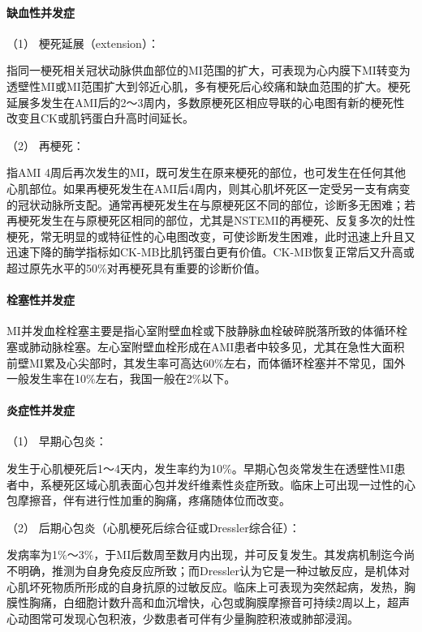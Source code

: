 \paragraph{缺血性并发症}

\hypertarget{text00312.htmlux5cux23CHP10-8-2-2-1-6-2-1}{}
（1） 梗死延展（extension）：

指同一梗死相关冠状动脉供血部位的MI范围的扩大，可表现为心内膜下MI转变为透壁性MI或MI范围扩大到邻近心肌，多有梗死后心绞痛和缺血范围的扩大。梗死延展多发生在AMI后的2～3周内，多数原梗死区相应导联的心电图有新的梗死性改变且CK或肌钙蛋白升高时间延长。

\hypertarget{text00312.htmlux5cux23CHP10-8-2-2-1-6-2-2}{}
（2） 再梗死：

指AMI
4周后再次发生的MI，既可发生在原来梗死的部位，也可发生在任何其他心肌部位。如果再梗死发生在AMI后4周内，则其心肌坏死区一定受另一支有病变的冠状动脉所支配。通常再梗死发生在与原梗死区不同的部位，诊断多无困难；若再梗死发生在与原梗死区相同的部位，尤其是NSTEMI的再梗死、反复多次的灶性梗死，常无明显的或特征性的心电图改变，可使诊断发生困难，此时迅速上升且又迅速下降的酶学指标如CK-MB比肌钙蛋白更有价值。CK-MB恢复正常后又升高或超过原先水平的50\%对再梗死具有重要的诊断价值。

\paragraph{栓塞性并发症}

MI并发血栓栓塞主要是指心室附壁血栓或下肢静脉血栓破碎脱落所致的体循环栓塞或肺动脉栓塞。左心室附壁血栓形成在AMI患者中较多见，尤其在急性大面积前壁MI累及心尖部时，其发生率可高达60\%左右，而体循环栓塞并不常见，国外一般发生率在10\%左右，我国一般在2\%以下。

\paragraph{炎症性并发症}

\hypertarget{text00312.htmlux5cux23CHP10-8-2-2-1-6-4-1}{}
（1） 早期心包炎：

发生于心肌梗死后1～4天内，发生率约为10\%。早期心包炎常发生在透壁性MI患者中，系梗死区域心肌表面心包并发纤维素性炎症所致。临床上可出现一过性的心包摩擦音，伴有进行性加重的胸痛，疼痛随体位而改变。

\hypertarget{text00312.htmlux5cux23CHP10-8-2-2-1-6-4-2}{}
（2） 后期心包炎（心肌梗死后综合征或Dressler综合征）：

发病率为1\%～3\%，于MI后数周至数月内出现，并可反复发生。其发病机制迄今尚不明确，推测为自身免疫反应所致；而Dressler认为它是一种过敏反应，是机体对心肌坏死物质所形成的自身抗原的过敏反应。临床上可表现为突然起病，发热，胸膜性胸痛，白细胞计数升高和血沉增快，心包或胸膜摩擦音可持续2周以上，超声心动图常可发现心包积液，少数患者可伴有少量胸腔积液或肺部浸润。

